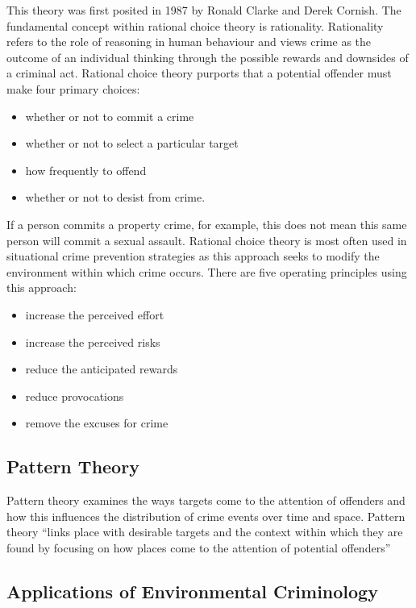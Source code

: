 \documentclass{article}
\begin{document}
This theory was first posited in 1987 by Ronald Clarke and Derek Cornish. The fundamental concept within rational choice theory is rationality. Rationality refers to the role of reasoning in human behaviour and views crime as the outcome of an individual thinking through the possible rewards and downsides of a criminal act. Rational choice theory purports that a potential offender must make four primary choices:

\begin{itemize}
    \item whether or not to commit a crime
    \item whether or not to select a particular target
    \item how frequently to offend
    \item whether or not to desist from crime.
\end{itemize}

If a person commits a property crime, for example, this does not mean this same person will commit a sexual assault. Rational choice theory is most often used in situational crime prevention strategies as this approach seeks to modify the environment within which crime occurs. There are five operating principles using this approach:

\begin{itemize}
    \item increase the perceived effort
    \item increase the perceived risks
    \item reduce the anticipated rewards
    \item reduce provocations
    \item remove the excuses for crime
\end{itemize}

\subsection{Pattern Theory}

Pattern theory examines the ways targets come to the attention of offenders and how this influences the distribution of crime events over time and space. Pattern theory “links place with desirable targets and the context within which they are found by focusing on how places come to the attention of potential offenders”

\subsection{Applications of Environmental Criminology}
\end{document}
